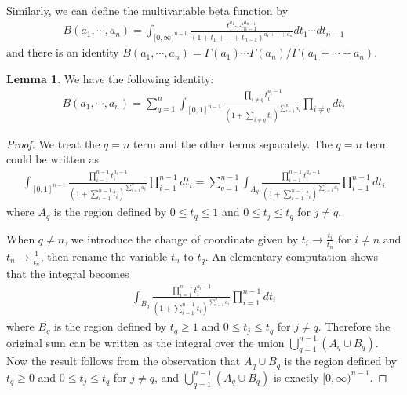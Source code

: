 \documentclass[11pt,reqno]{amsart}
\theoremstyle{definition}
\newtheorem{lemma}[theorem]{Lemma}
\numberwithin{equation}{section}
\begin{document}
\smallskip

Similarly, we can define the multivariable beta function by
\begin{align*}
	B(a_1,\cdots,a_n)=\int_{[0,\infty)^{n-1}}\frac{t_1^{a_1}\cdots t_{n-1}^{a_{n-1}}}{(1+t_1+\cdots+t_{n-1})^{a_1+\cdots+a_n}}dt_1\cdots dt_{n-1}
\end{align*}
and there is an identity $B(a_1,\cdots,a_n)=\Gamma(a_1)\cdots\Gamma(a_n)/\Gamma(a_1+\cdots+a_n)$.

\smallskip

\begin{lemma}\label{identity of beta function}
We have the following identity:
	\begin{align*}
		B(a_1,\cdots,a_n)=\sum_{q=1}^n \int_{[0,1]^{n-1}}\frac{\prod_{i\not=q}t_i^{a_i-1}}{\left(1+\sum_{i\not=q}t_i\right)^{\sum_{i=1}^n a_i}}\prod_{i\not=q}dt_i
	\end{align*}
\end{lemma}
\begin{proof}
	We treat the $q=n$ term and the other terms separately. The $q=n$ term could be written as
	\begin{align*}
		\int_{[0,1]^{n-1}}\frac{\prod_{i=1}^{n-1}t_i^{a_i-1}}{\left(1+\sum_{i=1}^{n-1}t_i\right)^{\sum_{i=1}^n a_i}}\prod_{i=1}^{n-1}dt_i = \sum_{q=1}^{n-1} \int_{A_q}\frac{\prod_{i=1}^{n-1}t_i^{a_i-1}}{\left(1+\sum_{i=1}^{n-1}t_i\right)^{\sum_{i=1}^n a_i}}\prod_{i=1}^{n-1}dt_i
	\end{align*}
	where $A_q$ is the region defined by $0\leq t_q\leq 1$ and $0\leq t_j\leq t_q$ for $j\not=q$.
	
	
	\smallskip
	
	 When $q\not=n$, we introduce the change of coordinate given by $t_i\rightarrow \frac{t_i}{t_n}$ for $i\not=n$ and $t_n\rightarrow \frac{1}{t_n}$, then rename the variable $t_n$ to $t_q$. An elementary computation shows that the integral becomes
	\begin{align*}
		\int_{B_q}\frac{\prod_{i=1}^{n-1}t_i^{a_i-1}}{\left(1+\sum_{i=1}^{n-1}t_i\right)^{\sum_{i=1}^n a_i}}\prod_{i=1}^{n-1}dt_i
	\end{align*}
	where $B_q$ is the region defined by $t_q\geq 1$ and $0\leq t_j\leq t_q$ for $j\not=q$. Therefore the original sum can be written as the integral over the union $\bigcup_{q=1}^{n-1}(A_q\cup B_q)$. Now the result follows from the observation that $A_q\cup B_q$ is the region defined by $t_q\geq 0$ and $0\leq t_j\leq t_q$ for $j\not=q$, and $\bigcup_{q=1}^{n-1}(A_q\cup B_q)$ is exactly $[0,\infty)^{n-1}$.
\end{proof}
\end{document}
